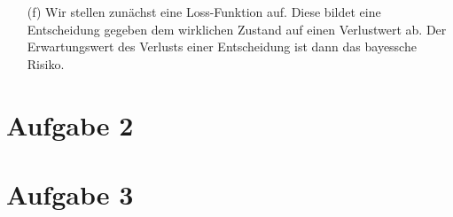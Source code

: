 \documentclass[a4paper]{scrartcl}
\begin{document}
\begin{itemize}
\item[(f)] Wir stellen zunächst eine Loss-Funktion auf. Diese bildet eine Entscheidung gegeben dem wirklichen Zustand auf einen Verlustwert ab. Der Erwartungswert des Verlusts einer Entscheidung ist dann das bayessche Risiko.






\end{itemize}

\section*{Aufgabe 2}

\section*{Aufgabe 3}
\end{document}
